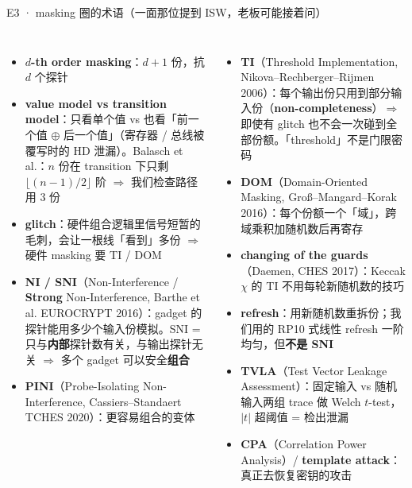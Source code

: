\documentclass[aspectratio=169,10pt,fontset=none]{ctexbeamer}
\begin{document}
\begin{frame}{E3 · masking 圈的术语（一面那位提到 ISW，老板可能接着问）}
\begin{columns}[T]
\begin{itemize}
  \item \textbf{$d$-th order masking}：$d+1$ 份，抗 $d$ 个探针
  \item \textbf{value model vs transition model}：只看单个值 vs 也看「前一个值 $\oplus$ 后一个值」（寄存器 / 总线被覆写时的 HD 泄漏）。Balasch et al.：$n$ 份在 transition 下只剩 $\lfloor(n-1)/2\rfloor$ 阶 $\Rightarrow$ 我们检查路径用 3 份
  \item \textbf{glitch}：硬件组合逻辑里信号短暂的毛刺，会让一根线「看到」多份 $\Rightarrow$ 硬件 masking 要 TI / DOM
  \item \textbf{NI / SNI}（Non-Interference / \textbf{Strong} Non-Interference, Barthe et al. EUROCRYPT 2016）：gadget 的探针能用多少个输入份模拟。SNI = 只与\textbf{内部}探针数有关，与输出探针无关 $\Rightarrow$ 多个 gadget 可以安全\textbf{组合}
  \item \textbf{PINI}（Probe-Isolating Non-Interference, Cassiers--Standaert TCHES 2020）：更容易组合的变体
\end{itemize}
\begin{itemize}
  \item \textbf{TI}（Threshold Implementation, Nikova--Rechberger--Rijmen 2006）：每个输出份只用到部分输入份（\textbf{non-completeness}）$\Rightarrow$ 即使有 glitch 也不会一次碰到全部份额。「threshold」\alert{不是}门限密码
  \item \textbf{DOM}（Domain-Oriented Masking, Groß--Mangard--Korak 2016）：每个份额一个「域」，跨域乘积加随机数后再寄存
  \item \textbf{changing of the guards}（Daemen, CHES 2017）：Keccak $\chi$ 的 TI 不用每轮新随机数的技巧
  \item \textbf{refresh}：用新随机数重拆份；我们用的 RP10 式线性 refresh 一阶均匀，但\textbf{不是 SNI}
  \item \textbf{TVLA}（Test Vector Leakage Assessment）：固定输入 vs 随机输入两组 trace 做 Welch $t$-test，$|t|$ 超阈值 = 检出泄漏
  \item \textbf{CPA}（Correlation Power Analysis）/ \textbf{template attack}：真正去恢复密钥的攻击
\end{itemize}
\end{columns}
\end{frame}
\end{document}

